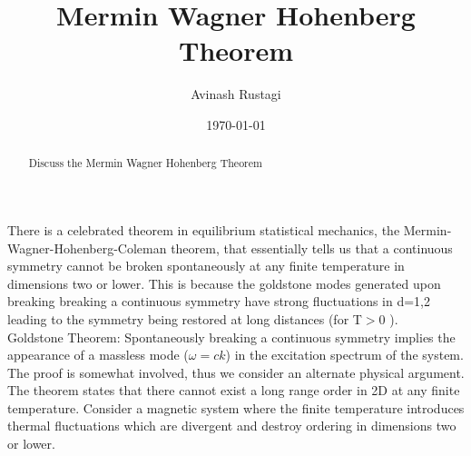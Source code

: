\documentclass[aps,prb,onecolumn,notitlepage,showpacs,floatfix,superscriptaddress]{revtex4-1}
\begin{document}
\title{Mermin Wagner Hohenberg Theorem}

\author{Avinash Rustagi}
%
\date{\today}
\begin{abstract}
Discuss the Mermin Wagner Hohenberg Theorem
\end{abstract}

\maketitle
%
There is a celebrated theorem in equilibrium statistical mechanics, the Mermin-Wagner-Hohenberg-Coleman theorem, that essentially tells us that a continuous symmetry cannot be broken spontaneously at any finite temperature in dimensions two or lower. This is because the goldstone modes generated upon breaking breaking a continuous symmetry have strong fluctuations in d=1,2 leading to the symmetry being restored at long distances (for T$>$0 ).\\

Goldstone Theorem: Spontaneously breaking a continuous symmetry implies the appearance of a massless mode ($\omega = ck$) in the excitation spectrum of the system. \\

The proof is somewhat involved, thus we consider an alternate physical argument. The theorem states that there cannot exist a long range order in 2D at any finite temperature. Consider a magnetic system where the finite temperature introduces thermal fluctuations which are divergent and destroy ordering in dimensions two or lower. \\
\end{document}
